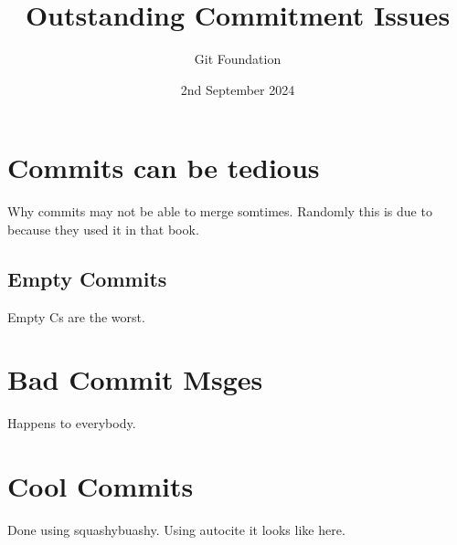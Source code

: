 \documentclass{article}
\title{Outstanding Commitment Issues}
\author{Git Foundation}
\date{2nd September 2024}
\begin{document}

\maketitle
\newpage
\doublespacing
\tableofcontents
\newpage
\singlespacing
\section{Commits can be tedious}
Why commits may not be able to merge somtimes. Randomly this is due to \cite{DUMMY:1} because they used it in that book.
\subsection{Empty Commits}
Empty Cs are the worst.
\section {Bad Commit Msges}
Happens to everybody.
\section {Cool Commits}
Done using squashybuashy. Using autocite it looks like \autocite[44]{DUMMY:1} here.
\printbibliography
\end{document}
